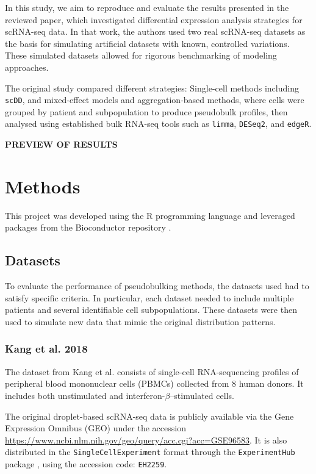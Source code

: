 \documentclass[a4paper, 11pt, twocolumn]{article}
\begin{document}
\begin{multicols}{2}
In this study, we aim to reproduce and evaluate the results presented in the reviewed paper, which investigated differential expression analysis strategies for scRNA-seq data. In that work, the authors used two real scRNA-seq datasets as the basis for simulating artificial datasets with known, controlled variations. These simulated datasets allowed for rigorous benchmarking of modeling approaches.

The original study compared different strategies: Single-cell methods including \texttt{scDD}, and mixed-effect models and aggregation-based methods, where cells were grouped by patient and subpopulation to produce pseudobulk profiles, then analysed using established bulk RNA-seq tools such as \texttt{limma}, \texttt{DESeq2}, and \texttt{edgeR}. 

\textbf{PREVIEW OF RESULTS}

\section{Methods}

This project was developed using the R programming language \citep{base} and leveraged packages from the Bioconductor repository \citep{bioc}.

\subsection{Datasets}

To evaluate the performance of pseudobulking methods, the datasets used had to satisfy specific criteria. In particular, each dataset needed to include multiple patients and several identifiable cell subpopulations. These datasets were then used to simulate new data that mimic the original distribution patterns.

\subsubsection{Kang et al. 2018}

The dataset from Kang et al. \citep{kang_multiplexed_2018} consists of single-cell RNA-sequencing profiles of peripheral blood mononuclear cells (PBMCs) collected from 8 human donors. It includes both unstimulated and interferon-$\beta$–stimulated cells.

The original droplet-based scRNA-seq data is publicly available via the Gene Expression Omnibus (GEO) under the accession \url{https://www.ncbi.nlm.nih.gov/geo/query/acc.cgi?acc=GSE96583}. It is also distributed in the \texttt{SingleCellExperiment} format \citep{sce} through the \texttt{ExperimentHub} package \citep{ExperimentHub}, using the accession code: \texttt{EH2259}.


\end{multicols}
\end{document}
